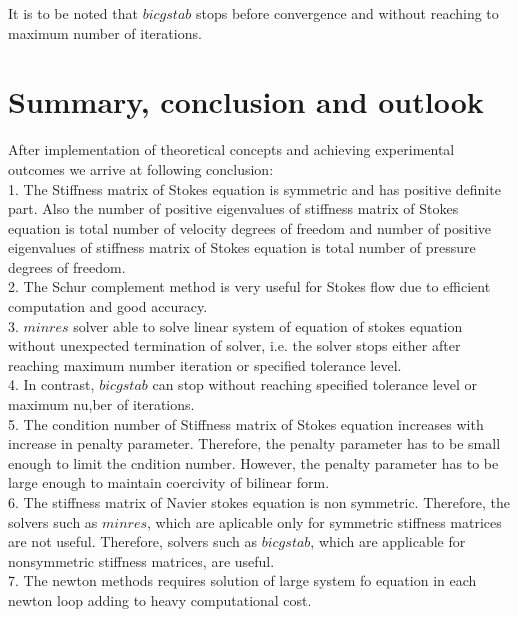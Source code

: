 \documentclass[a4paper]{book}
\begin{document}
It is to be noted that $bicgstab$ stops before convergence and without reaching to maximum number of iterations.

\chapter{Summary, conclusion and outlook}

After implementation of theoretical concepts and achieving experimental outcomes we arrive at following conclusion: \\

1. The Stiffness matrix of Stokes equation is symmetric and has positive definite part. Also the number of positive eigenvalues of stiffness matrix of Stokes equation is total number of velocity degrees of freedom and number of positive eigenvalues of stiffness matrix of Stokes equation is total number of pressure degrees of freedom.\\

2. The Schur complement method is very useful for Stokes flow due to efficient computation and good accuracy. \\

3. $minres$ solver able to solve linear system of equation of stokes equation without unexpected termination of solver, i.e. the solver stops either after reaching maximum number iteration or specified tolerance level.\\

4. In contrast, $bicgstab$ can stop without reaching specified tolerance level or maximum nu,ber of iterations.\\

5. The condition number of Stiffness matrix of Stokes equation increases with increase in penalty parameter. Therefore, the penalty parameter has to be small enough to limit the cndition number. However, the penalty parameter has to be large enough to maintain coercivity of bilinear form. \\

6. The stiffness matrix of Navier stokes equation is non symmetric. Therefore, the solvers such as $minres$, which are aplicable only for symmetric stiffness matrices are not useful. Therefore, solvers such as $bicgstab$, which are applicable for nonsymmetric stiffness matrices, are useful.\\

7. The newton methods requires solution of large system fo equation in each newton loop adding to heavy computational cost.\\
\end{document}
